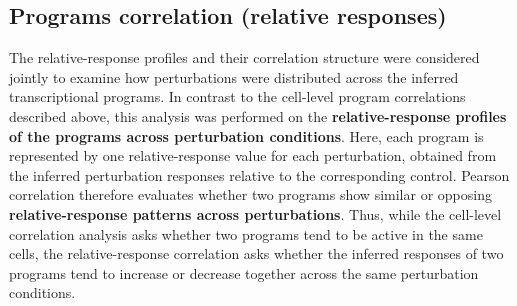 \documentclass[11pt,a4paper]{article}
\begin{document}
\subsection{Programs correlation (relative responses)}


The relative-response profiles and their correlation structure were considered jointly to examine how perturbations were distributed across the inferred transcriptional programs. In contrast to the cell-level program correlations described above, this analysis was performed on the \textbf{relative-response profiles of the programs across perturbation conditions}. Here, each program is represented by one relative-response value for each perturbation, obtained from the inferred perturbation responses relative to the corresponding control. Pearson correlation therefore evaluates whether two programs show similar or opposing \textbf{relative-response patterns across perturbations}. Thus, while the cell-level correlation analysis asks whether two programs tend to be active in the same cells, the relative-response correlation asks whether the inferred responses of two programs tend to increase or decrease together across the same perturbation conditions. \\
\end{document}
